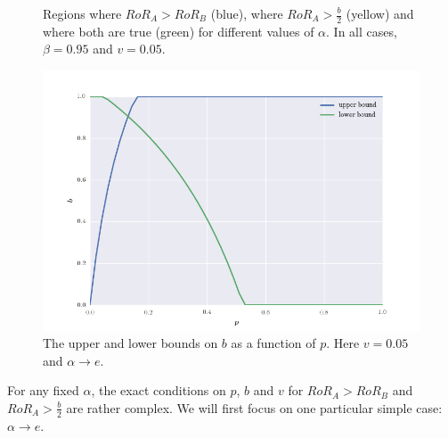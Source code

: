 \begin{figure}[t!]
\caption{{Regions where $RoR_A > RoR_B$ (blue), where $RoR_A > \frac{b}{2}$ (yellow) and where both are true (green) for different values of $\alpha$. In all cases, $\beta = 0.95$ and $v = 0.05$.}}
\label{fig:offer_reward_or_not}
\end{figure}

\begin{figure}[t]
\centering
\includegraphics[scale = 0.6]{./figures/b_region_v2.png}
\caption{The upper and lower bounds on $b$ as a function of $p$. Here $v = 0.05$ and $\alpha \rightarrow e$.}
\label{fig:b_region}
\end{figure}

For any fixed $\alpha$, the exact conditions on $p$, $b$ and $v$ for $RoR_A > RoR_B$ and $RoR_A > \frac{b}{2}$ are rather complex. We will first focus on one particular simple case: $\alpha \rightarrow e$. 

